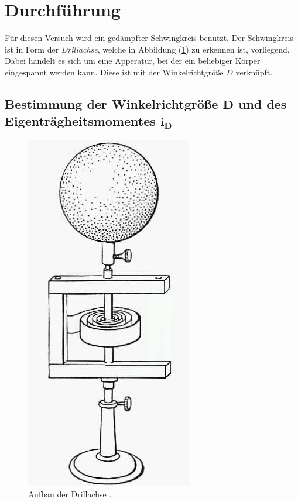 \section{Durchführung}
\label{sec:Durchführung}

Für diesen Versuch wird ein gedämpfter Schwingkreis benutzt.
Der Schwingkreis ist in Form der \textit{Drillachse}, welche in Abbildung (\ref{fig:drillachse}) zu erkennen ist, vorliegend.
Dabei handelt es sich um eine Apperatur, bei der ein beliebiger Körper eingespannt werden kann.
Diese ist mit der Winkelrichtgröße $D$ verknüpft.

\subsection{Bestimmung der Winkelrichtgröße $\pmb{D}$ und des Eigenträgheitsmomentes $\pmb{i_{D}}$} \label{subsec:Winkelrichtgröße}

\begin{figure}[H]
    \centering
    \includegraphics{pictures/Drillachse.png}
    \caption{Aufbau der Drillachse \cite{v101}.}
    \label{fig:drillachse}
\end{figure}

